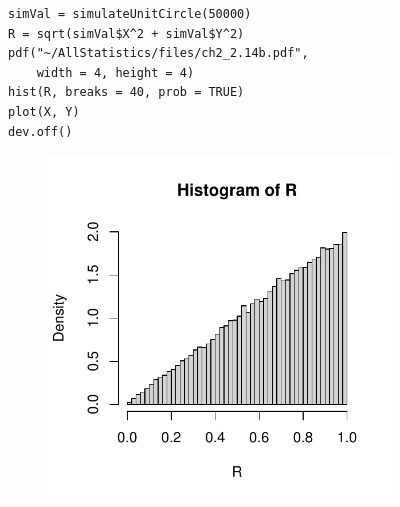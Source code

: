 \begin{figure}[H]
\begin{minipage}{0.5\textwidth}
    \begin{lstlisting}[style=RSyntax]
simVal = simulateUnitCircle(50000)
R = sqrt(simVal$X^2 + simVal$Y^2)
pdf("~/AllStatistics/files/ch2_2.14b.pdf",
    width = 4, height = 4)
hist(R, breaks = 40, prob = TRUE)
plot(X, Y)
dev.off()
    \end{lstlisting}
    \rule{0pt}{55pt}
\end{minipage}
\begin{minipage}{0.5\textwidth}
    \begin{center}
        \begin{figure}[H]
        \includegraphics[scale=0.7]{ch2_2.14b.pdf}
        \end{figure}
    \end{center}
\end{minipage}
\end{figure}




